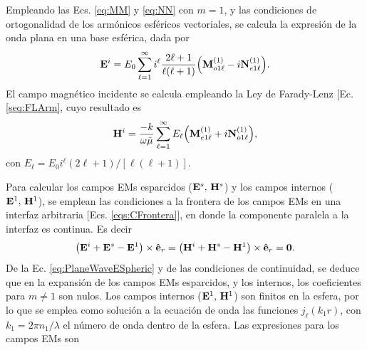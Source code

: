 						
\vspace*{-1em}\noindent 
Empleando las Ecs. \eqref{eq:MM} y \eqref{eq:NN} con $m=1$, y las condiciones de ortogonalidad de los armónicos esféricos vectoriales, se calcula la expresión de la onda plana en una base esférica, dada por
	\begin{equation}
	\vb{E}^i = E_0 \sum_{\ell =1}^\infty i^\ell \frac{2\ell+1}{\ell(\ell+1)}\qty(\vb{M}_{o1\ell}^{(1)}-i\vb{N}_{e1\ell}^{(1)}).
	\label{eq:PlaneWaveESpheric}
	\end{equation}
El campo magnético incidente se calcula empleando la Ley de Farady-Lenz [Ec. \eqref{seq:FLArm}, cuyo resultado es
	\begin{equation}
	\vb{H}^i =\frac{-k}{\omega\tilde{\mu}} \sum_{\ell =1}^\infty  E_\ell\qty(\vb{M}_{e1\ell}^{(1)}+i\vb{N}_{o1\ell}^{(1)}),
	\label{eq:PlaneWaveESpheric}
	\end{equation}
con $E_\ell = E_0 i^\ell (2\ell+1)/[\ell(\ell+1)]$.

Para calcular los campos EMs esparcidos ($\vb{E}^s,\,\vb{H}^s$) y los campos internos ($\vb{E}^1,\,\vb{H}^1$), se emplean las condiciones a la frontera de los campos EMs en una interfaz arbitraria [Ecs. \eqref{eqs:CFrontera}], en donde la componente paralela a la interfaz es continua. Es decir
	\begin{align}
	\qty(\vb{E}^i+\vb{E}^s -\vb{E}^1)\times\vu{e}_r =
	\qty(\vb{H}^i+\vb{H}^s -\vb{H}^1)\times\vu{e}_r = \vb{0}.
	\end{align}
De la Ec. \eqref{eq:PlaneWaveESpheric} y de las condiciones de continuidad, se deduce que en la expansión de los campos EMs esparcidos, y los internos, los coeficientes para $m\neq 1$ son nulos. Los campos internos  ($\vb{E}^1,\,\vb{H}^1$) son finitos en la esfera, por lo que se emplea como solución a la ecuación de onda las funciones $j_\ell(k_1 r)$, con $k_1 = 2\pi n_1 /\lambda$ el número de onda dentro de la esfera. Las expresiones para los campos EMs son
	

